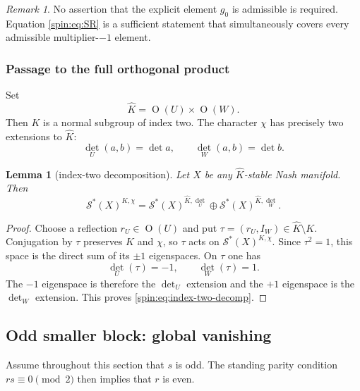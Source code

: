 \documentclass[11pt,reqno]{amsart}
\numberwithin{equation}{section}
\newtheorem{lemma}[theorem]{Lemma}
\theoremstyle{definition}
\theoremstyle{remark}
\newtheorem{remark}[theorem]{Remark}
\newcommand{\Or}{\operatorname{O}}
\newcommand{\cS}{\mathcal S}
\begin{document}
\begin{remark}
No assertion that the explicit element $g_0$ is admissible is required.
Equation \eqref{spin:eq:SR} is a sufficient statement that simultaneously covers
every admissible multiplier-$-1$ element.
\end{remark}

\subsubsection{Passage to the full orthogonal product}

Set
\begin{equation}\label{spin:eq:Khat}
  \widehat K=\Or(U)\times\Or(W).
\end{equation}
Then $K$ is a normal subgroup of index two.  The character $\chi$ has precisely
two extensions to $\widehat K$:
\begin{equation}\label{spin:eq:det-extensions}
  \det_U(a,b)=\det a,
  \qquad
  \det_W(a,b)=\det b.
\end{equation}

\begin{lemma}[index-two decomposition]\label{spin:lem:index-two}
Let $X$ be any $\widehat K$-stable Nash manifold.  Then
\begin{equation}\label{spin:eq:index-two-decomp}
  \cS^*(X)^{K,\chi}
  =
  \cS^*(X)^{\widehat K,\det_U}
  \oplus
  \cS^*(X)^{\widehat K,\det_W}.
\end{equation}
\end{lemma}

\begin{proof}
Choose a reflection $r_U\in\Or(U)$ and put
$\tau=(r_U,I_W)\in\widehat K\setminus K$.  Conjugation by $\tau$ preserves
$K$ and $\chi$, so $\tau$ acts on $\cS^*(X)^{K,\chi}$.  Since $\tau^2=1$,
this space is the direct sum of its $\pm1$ eigenspaces.  On $\tau$ one has
\[
  \det_U(\tau)=-1,
  \qquad
  \det_W(\tau)=1.
\]
The $-1$ eigenspace is therefore the $\det_U$ extension and the $+1$
eigenspace is the $\det_W$ extension.  This proves
\eqref{spin:eq:index-two-decomp}.
\end{proof}

\subsection{Odd smaller block: global vanishing}\label{spin:sec:odd}

Assume throughout this section that $s$ is odd.  The standing parity condition
$rs\equiv0\pmod2$ then implies that $r$ is even.
\end{document}
